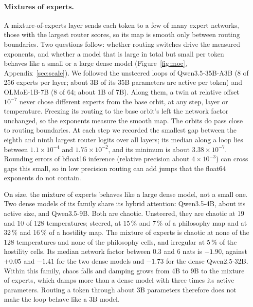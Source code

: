 \documentclass[11pt,letterpaper]{article}
\begin{document}
\paragraph{Mixtures of experts.} A mixture-of-experts layer sends each token to a few of many expert networks, those
with the largest router scores, so its map is smooth only between routing boundaries. Two questions follow: whether
routing switches drive the measured exponents, and whether a model that is large in total but small per token behaves
like a small or a large dense model (Figure~\ref{fig:moe}, Appendix~\ref{sec:scale}). We followed the unsteered loops
of Qwen3.5-35B-A3B (8 of 256 experts per layer; about 3B of its 35B parameters are active per token) and OLMoE-1B-7B
(8 of 64; about 1B of 7B). Along them, a twin at relative offset $10^{-7}$ never chose different experts from the base
orbit, at any step, layer or temperature. Freezing its routing to the base orbit's left the network factor unchanged,
so the exponents measure the smooth map. The orbits do pass close to routing boundaries. At each step we recorded the
smallest gap between the eighth and ninth largest router logits over all layers; its median along a loop lies between
$1.1\times10^{-4}$ and $1.75\times10^{-2}$, and its minimum is about $3.38\times10^{-7}$. Rounding errors of bfloat16
inference (relative precision about $4\times10^{-3}$) can cross gaps this small, so in low precision routing can add
jumps that the float64 exponents do not contain.

On size, the mixture of experts behaves like a large dense model, not a small one. Two dense models of its family share
its hybrid attention: Qwen3.5-4B, about its active size, and Qwen3.5-9B. Both are chaotic. Unsteered, they are chaotic
at 19 and 10 of 128 temperatures; steered, at 15\,\% and 7\,\% of a philosophy map and at 32\,\% and 16\,\% of a
hostility map. The mixture of experts is chaotic at none of the 128 temperatures and none of the philosophy cells, and
irregular at 5\,\% of the hostility cells. Its median network factor between 0.3 and 6 nats is $-1.90$, against $+0.05$
and $-1.41$ for the two dense models and $-1.73$ for the dense Qwen2.5-32B. Within this family, chaos falls and damping
grows from 4B to 9B to the mixture of experts, which damps more than a dense model with three times its active
parameters. Routing a token through about 3B parameters therefore does not make the loop behave like a 3B model.
\end{document}
